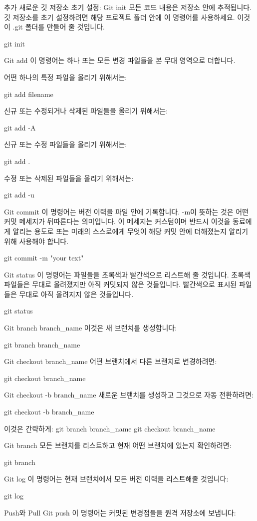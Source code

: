 추가
새로운 깃 저장소 초기 설정: Git init
모든 코드 내용은 저장소 안에 추적됩니다. 깃 저장소를 초기 설정하려면 해당 프로젝트 폴더 안에 이 명령어를 사용하세요. 이것이 .git 폴더를 만들어 줄 것입니다.

git init

Git add
이 명령어는 하나 또는 모든 변경 파일들을 본 무대 영역으로 더합니다.

어떤 하나의 특정 파일을 올리기 위해서는:

git add filename

신규 또는 수정되거나 삭제된 파일들을 올리기 위해서는:

git add -A

신규 또는 수정 파일들을 올리기 위해서는:

git add .

수정 또는 삭제된 파일들을 올리기 위해서는:

git add -u

Git commit
이 명령어는 버전 이력을 파일 안에 기록합니다. -m이 뜻하는 것은 어떤 커밋 메세지가 뒤따른다는 의미입니다. 이 메세지는 커스텀이며 반드시 이것을 동료에게 알리는 용도로 또는 미래의 스스로에게 무엇이 해당 커밋 안에 더해졌는지 알리기 위해 사용해야 합니다.

git commit -m "your text"

Git status
이 명령어는 파일들을 초록색과 빨간색으로 리스트해 줄 것입니다. 초록색 파일들은 무대로 올려졌지만 아직 커밋되지 않은 것들입니다. 빨간색으로 표시된 파일들은 무대로 아직 올려지지 않은 것들입니다.

git status

Git branch branch_name
이것은 새 브랜치를 생성합니다:

git branch branch_name

Git checkout branch_name
어떤 브랜치에서 다른 브랜치로 변경하려면:

git checkout branch_name

Git checkout -b branch_name
새로운 브랜치를 생성하고 그것으로 자동 전환하려면:

git checkout -b branch_name

이것은 간략하게:
git branch branch_name
git checkout branch_name


Git branch
모든 브랜치를 리스트하고 현재 어떤 브랜치에 있는지 확인하려면:

git branch

Git log
이 명령어는 현재 브랜치에서 모든 버전 이력을 리스트해줄 것입니다:

git log

Push와 Pull
Git push
이 명령어는 커밋된 변경점들을 원격 저장소에 보냅니다:

